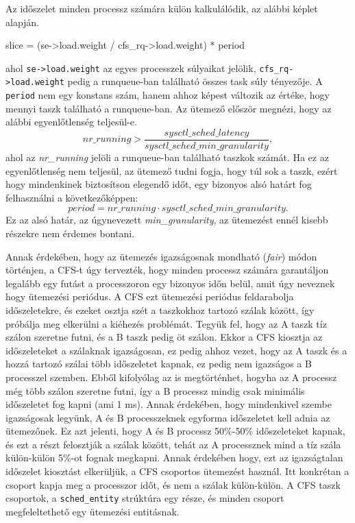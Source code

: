 Az időszelet minden processz számára külön kalkulálódik, az alábbi képlet alapján.
\begin{cpp}
slice = (se->load.weight / cfs_rq->load.weight) * period
\end{cpp}
ahol \texttt{se->load.weight} az egyes processzek súlyaikat jelölik, \texttt{cfs\_rq->load.weight} pedig a runqueue-ban található összes task súly tényezője. A \texttt{period} nem egy konstans szám, hanem ahhoz képest változik az értéke, hogy mennyi taszk található a runqueue-ban. 
Az ütemező először megnézi, hogy az alábbi egyenlőtlenség teljesül-e.
\begin{equation}
nr\_running > \frac{sysctl\_sched\_latency}{sysctl\_sched\_min\_granularity},
\end{equation}
ahol az \textit{nr\_running} jelöli a runqueue-ban található taszkok számát. Ha ez az egyenlőtlenség nem teljesül, az ütemező tudni fogja, hogy túl sok a taszk, ezért hogy mindenkinek biztosítson elegendő időt, egy bizonyos alsó határt fog felhasználni a következőképpen:
\begin{equation}
period =  nr\_running \cdot sysctl\_sched\_min\_granularity.
\end{equation}
Ez az alsó határ, az úgynevezett \textit{min\_granularity}, az ütemezést ennél kisebb részekre nem érdemes bontani.


Annak érdekében, hogy az ütemezés igazságosnak mondható (\textit{fair}) módon történjen, a CFS-t úgy tervezték, hogy minden processz számára garantáljon legalább egy futást a processzoron egy bizonyos időn belül, amit úgy neveznek hogy ütemezési periódus.
A CFS ezt ütemezési periódus feldarabolja időszeletekre, és ezeket osztja szét a taszkokhoz tartozó szálak között, így próbálja meg elkerülni a kiéhezés problémát.
Tegyük fel, hogy az A taszk tíz szálon szeretne futni, és a B taszk pedig öt szálon. Ekkor a CFS kiosztja az időszeleteket a szálaknak igazságosan, ez pedig ahhoz vezet, hogy az A taszk és a hozzá tartozó szálai több időszeletet kapnak, ez pedig nem igazságos a B processzel szemben.
Ebből kifolyólag az is megtörténhet, hogyha az A processz még több szálon szeretne futni, így a B processz mindig csak minimális időszeletet fog kapni (ami 1 ms). Annak érdekében, hogy mindenkivel szembe igazságosak legyünk, A és B processzeknek egyforma időszeletet kell adnia az ütemezőnek. Ez azt jelenti, hogy A és B processz 50\%-50\% időszeleteket kapnak, és ezt a részt felosztják a szálak között, tehát az A processznek mind a tíz szála külön-külön 5\%-ot fognak megkapni.
Annak érdekében hogy, ezt az igazságtalan időszelet kiosztást elkerüljük, a CFS csoportos ütemezést használ. Itt konkrétan a csoport kapja meg a processzor időt, és nem a szálak külön-külön.
A CFS taszk csoportok, a \texttt{sched\_entity} strúktúra egy része, és minden csoport megfeleltethető egy ütemezési entitásnak.

